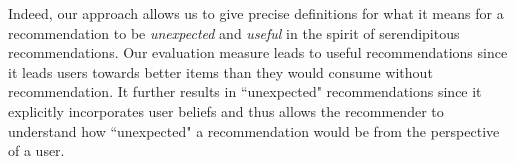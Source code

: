 \documentclass[manuscript]{acmart}
\begin{document}
\par 
Indeed, our approach allows us to give precise definitions for what it means for a recommendation to be \textit{unexpected} and \textit{useful} in the spirit of serendipitous recommendations. Our evaluation measure leads to useful recommendations since it leads users towards better items than they would consume without recommendation. It further results in ``unexpected" recommendations since it explicitly incorporates user beliefs and thus allows the recommender to understand how ``unexpected" a recommendation would be from the perspective of a user.


\end{document}
